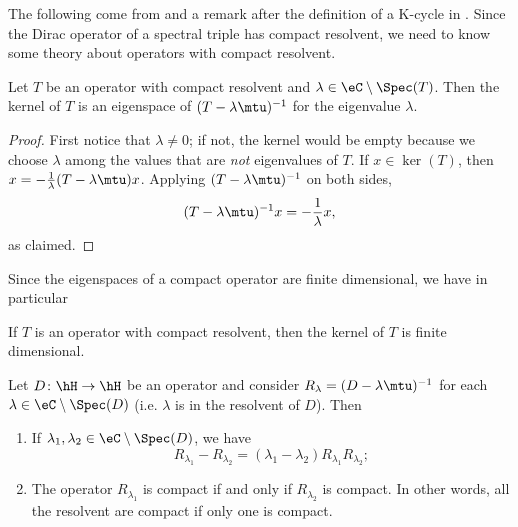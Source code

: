 The following come from \cite{Whittaker} and a remark after the definition of a K-cycle in \cite{itoNCG_Varilly}. Since the Dirac operator of a spectral triple has compact resolvent, we need to know some theory about operators with compact resolvent.

\begin{lemma}		\label{LemResComKerFin}
	Let $T$ be an operator with compact resolvent and $\lambda\in\eC\setminus\Spec(T)$. Then the kernel of $T$ is an eigenspace of $(T-\lambda\mtu)^{-1}$ for the eigenvalue $\lambda$.
\end{lemma}

\begin{proof}
	First notice that $\lambda\neq 0$; if not, the kernel would be empty because we choose $\lambda$ among the values that are \emph{not} eigenvalues of $T$. If $x\in\ker(T)$, then $x=-\frac{1}{ \lambda }(T-\lambda\mtu)x$. Applying $(T-\lambda\mtu)^{-1}$ on both sides,
	\begin{equation}
		(T-\lambda\mtu)^{-1}x=-\frac{1}{ \lambda }x,
	\end{equation}
	as claimed.
\end{proof}

Since the eigenspaces of a compact operator are finite dimensional, we have in particular 
\begin{corollary}		\label{CorRezcomkerfin}
	If $T$ is an operator with compact resolvent, then the kernel of $T$ is finite dimensional.
\end{corollary}

\begin{lemma}		\label{LemResLcmpResLLcmp}
	Let $D\colon \hH\to \hH$ be an operator and consider $R_{\lambda}=(D-\lambda\mtu)^{-1}$ for each $\lambda\in\eC\setminus\Spec(D)$ (i.e. $\lambda$ is in the resolvent of $D$). Then
	\begin{enumerate}
		\item
			If $\lambda_1,\lambda_2\in\eC\setminus\Spec(D)$, we have
			\begin{equation}
				R_{\lambda_1}-R_{\lambda_2}=(\lambda_1-\lambda_2)R_{\lambda_1}R_{\lambda_2};
			\end{equation}
		\item
			The operator $R_{\lambda_1}$ is compact if and only if $R_{\lambda_2}$ is compact. In other words, all the resolvent are compact if only one is compact.
	\end{enumerate}
\end{lemma}

